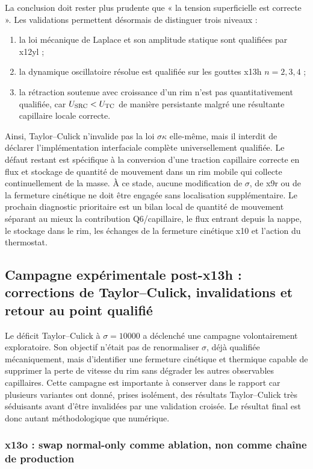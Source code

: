 \documentclass[11pt,a4paper]{article}
\begin{document}
La conclusion doit rester plus prudente que « la tension superficielle est correcte ». Les validations permettent désormais de distinguer trois niveaux :
\begin{enumerate}[label=(\roman*),leftmargin=2.5em]
  \item la loi mécanique de Laplace et son amplitude statique sont qualifiées par x12yl ;
  \item la dynamique oscillatoire résolue est qualifiée sur les gouttes x13h $n=2,3,4$ ;
  \item la rétraction soutenue avec croissance d'un rim n'est pas quantitativement qualifiée, car $U_{\rm SRC}<U_{\rm TC}$ de manière persistante malgré une résultante capillaire locale correcte.
\end{enumerate}
Ainsi, Taylor--Culick n'invalide pas la loi $\sigma\kappa$ elle-même, mais il interdit de déclarer l'implémentation interfaciale complète universellement qualifiée. Le défaut restant est spécifique à la conversion d'une traction capillaire correcte en flux et stockage de quantité de mouvement dans un rim mobile qui collecte continuellement de la masse. À ce stade, aucune modification de $\sigma$, de x9r ou de la fermeture cinétique ne doit être engagée sans localisation supplémentaire. Le prochain diagnostic prioritaire est un bilan local de quantité de mouvement séparant au mieux la contribution Q6/capillaire, le flux entrant depuis la nappe, le stockage dans le rim, les échanges de la fermeture cinétique x10 et l'action du thermostat.


\subsection{Campagne expérimentale post-x13h : corrections de Taylor--Culick, invalidations et retour au point qualifié}
\label{sec:x13-post-tc-experimental}

Le déficit Taylor--Culick à $\sigma=10000$ a déclenché une campagne volontairement exploratoire. Son objectif n'était pas de renormaliser $\sigma$, déjà qualifiée mécaniquement, mais d'identifier une fermeture cinétique et thermique capable de supprimer la perte de vitesse du rim sans dégrader les autres observables capillaires. Cette campagne est importante à conserver dans le rapport car plusieurs variantes ont donné, prises isolément, des résultats Taylor--Culick très séduisants avant d'être invalidées par une validation croisée. Le résultat final est donc autant méthodologique que numérique.

\subsubsection{x13o : swap normal-only comme ablation, non comme chaîne de production}
\end{document}
